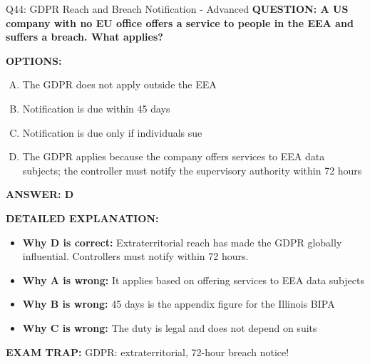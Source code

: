 \documentclass[8pt]{beamer}
\begin{document}
\begin{frame}[shrink=6]{Q44: GDPR Reach and Breach Notification - Advanced}
\fontsize{6.5}{7.5}\selectfont
\textbf{QUESTION: A US company with no EU office offers a service to people in the EEA and suffers a breach. What applies?}

\vspace{0.1cm}
\textbf{OPTIONS:}
\begin{enumerate}[A.]
\item The GDPR does not apply outside the EEA
\item Notification is due within 45 days
\item Notification is due only if individuals sue
\item The GDPR applies because the company offers services to EEA data subjects; the controller must notify the supervisory authority within 72 hours
\end{enumerate}

\vspace{0.1cm}
\textcolor{myblue}{\textbf{ANSWER: D}}

\vspace{0.1cm}
\textbf{DETAILED EXPLANATION:}
\begin{itemize}
\item \textbf{Why D is correct:} Extraterritorial reach has made the GDPR globally influential. Controllers must notify within 72 hours.
\item \textbf{Why A is wrong:} It applies based on offering services to EEA data subjects
\item \textbf{Why B is wrong:} 45 days is the appendix figure for the Illinois BIPA
\item \textbf{Why C is wrong:} The duty is legal and does not depend on suits
\end{itemize}

\textcolor{myred}{\textbf{EXAM TRAP:}} GDPR: extraterritorial, 72-hour breach notice!
\end{frame}
\end{document}
